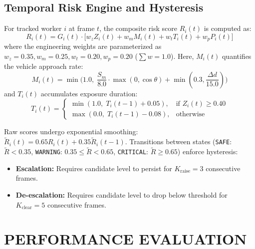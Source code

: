 \documentclass[letterpaper, 10 pt, conference]{ieeeconf}
\begin{document}
\subsection{Temporal Risk Engine and Hysteresis}
For tracked worker $i$ at frame $t$, the composite risk score $R_i(t)$ is computed as:
\begin{equation}
R_i(t) = G_i(t) \cdot \Big[ w_z Z_i(t) + w_m M_i(t) + w_t T_i(t) + w_p P_i(t) \Big]
\end{equation}
where the engineering weights are parameterized as $w_z = 0.35, w_m = 0.25, w_t = 0.20, w_p = 0.20$ ($\sum w = 1.0$). Here, $M_i(t)$ quantifies the vehicle approach rate:
\begin{equation}
M_i(t) = \min\Big(1.0, \; \frac{S_m}{8.0} \cdot \max(0, \cos \theta) + \min(0.3, \frac{\Delta d}{15.0})\Big)
\end{equation}
and $T_i(t)$ accumulates exposure duration:
\begin{equation}
T_i(t) = 
\begin{cases}
\min(1.0, \; T_i(t-1) + 0.05), & \text{if } Z_i(t) \ge 0.40 \\
\max(0.0, \; T_i(t-1) - 0.08), & \text{otherwise}
\end{cases}
\end{equation}

Raw scores undergo exponential smoothing: $\tilde{R}_i(t) = 0.65 R_i(t) + 0.35 \tilde{R}_i(t-1)$. Transitions between states (\texttt{SAFE}: $\tilde{R} < 0.35$, \texttt{WARNING}: $0.35 \le \tilde{R} < 0.65$, \texttt{CRITICAL}: $\tilde{R} \ge 0.65$) enforce hysteresis:
\begin{itemize}
    \item \textbf{Escalation:} Requires candidate level to persist for $K_{\text{raise}} = 3$ consecutive frames.
    \item \textbf{De-escalation:} Requires candidate level to drop below threshold for $K_{\text{clear}} = 5$ consecutive frames.
\end{itemize}

\section{PERFORMANCE EVALUATION}
\end{document}
